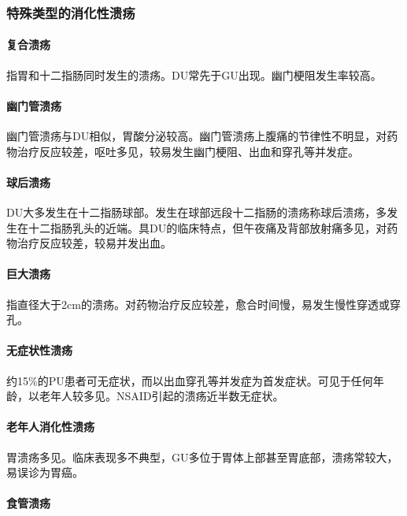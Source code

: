 \subsubsection{特殊类型的消化性溃疡}

\paragraph{复合溃疡}

指胃和十二指肠同时发生的溃疡。DU常先于GU出现。幽门梗阻发生率较高。

\paragraph{幽门管溃疡}

幽门管溃疡与DU相似，胃酸分泌较高。幽门管溃疡上腹痛的节律性不明显，对药物治疗反应较差，呕吐多见，较易发生幽门梗阻、出血和穿孔等并发症。

\paragraph{球后溃疡}

DU大多发生在十二指肠球部。发生在球部远段十二指肠的溃疡称球后溃疡，多发生在十二指肠乳头的近端。具DU的临床特点，但午夜痛及背部放射痛多见，对药物治疗反应较差，较易并发出血。

\paragraph{巨大溃疡}

指直径大于2cm的溃疡。对药物治疗反应较差，愈合时间慢，易发生慢性穿透或穿孔。

\paragraph{无症状性溃疡}

约15\%的PU患者可无症状，而以出血穿孔等并发症为首发症状。可见于任何年龄，以老年人较多见。NSAID引起的溃疡近半数无症状。

\paragraph{老年人消化性溃疡}

胃溃疡多见。临床表现多不典型，GU多位于胃体上部甚至胃底部，溃疡常较大，易误诊为胃癌。

\paragraph{食管溃疡}

